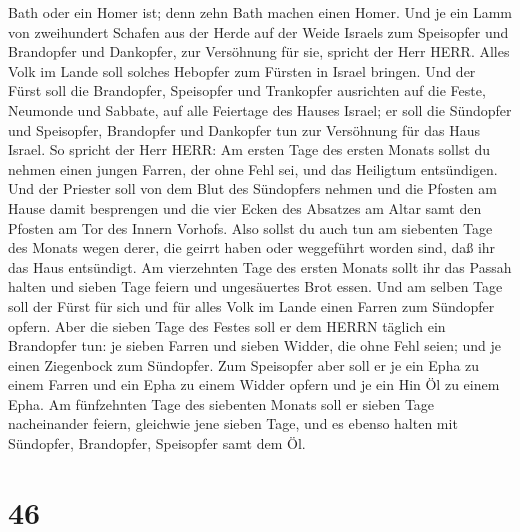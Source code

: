 Bath oder ein Homer ist; denn zehn Bath machen einen Homer.
 Und je ein Lamm von zweihundert Schafen aus der Herde auf
der Weide Israels zum Speisopfer und Brandopfer und Dankopfer, zur
Versöhnung für sie, spricht der Herr HERR.  Alles Volk im
Lande soll solches Hebopfer zum Fürsten in Israel bringen. 
Und der Fürst soll die Brandopfer, Speisopfer und Trankopfer ausrichten
auf die Feste, Neumonde und Sabbate, auf alle Feiertage des Hauses
Israel; er soll die Sündopfer und Speisopfer, Brandopfer und Dankopfer
tun zur Versöhnung für das Haus Israel.  So spricht der
Herr HERR: Am ersten Tage des ersten Monats sollst du nehmen einen
jungen Farren, der ohne Fehl sei, und das Heiligtum entsündigen.
 Und der Priester soll von dem Blut des Sündopfers nehmen
und die Pfosten am Hause damit besprengen und die vier Ecken des
Absatzes am Altar samt den Pfosten am Tor des Innern Vorhofs.
 Also sollst du auch tun am siebenten Tage des Monats wegen
derer, die geirrt haben oder weggeführt worden sind, daß ihr das Haus
entsündigt.  Am vierzehnten Tage des ersten Monats sollt
ihr das Passah halten und sieben Tage feiern und ungesäuertes Brot
essen.  Und am selben Tage soll der Fürst für sich und für
alles Volk im Lande einen Farren zum Sündopfer opfern. 
Aber die sieben Tage des Festes soll er dem HERRN täglich ein Brandopfer
tun: je sieben Farren und sieben Widder, die ohne Fehl seien; und je
einen Ziegenbock zum Sündopfer.  Zum Speisopfer aber soll
er je ein Epha zu einem Farren und ein Epha zu einem Widder opfern und
je ein Hin Öl zu einem Epha.  Am fünfzehnten Tage des
siebenten Monats soll er sieben Tage nacheinander feiern, gleichwie jene
sieben Tage, und es ebenso halten mit Sündopfer, Brandopfer, Speisopfer
samt dem Öl.

\hypertarget{section-45}{%
\section{46}\label{section-45}}

